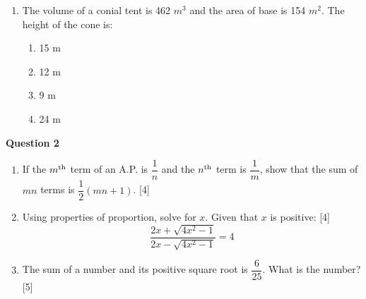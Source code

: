 \begin{enumerate}[label=(\roman*)]
    \item The volume of a conial tent is 462 $m^3$ and the area 
        of base is 154 $m^2$. The height of the cone is:

        \begin{multicols}{2}
        \begin{enumerate}[label=(\alph*)]
            \item  15 m
            \item  12 m
            \item  9 m
            \item  24 m
        \end{enumerate}
        \end{multicols}

\end{enumerate}

\newpage
\par
\noindent
\textbf{Question 2}\\
\begin{enumerate}[label=(\roman*)]

    \item If the $m\textsuperscript{th}$ term of an A.P. is 
        $\dfrac{1}{n}$ and the $n\textsuperscript{th}$ term is 
        $\dfrac{1}{m}$, show that the sum of $mn$ terms is 
        $\dfrac{1}{2}(mn + 1)$. \hfill [4]

    \item Using properties of proportion, solve for $x$. Given that 
        $x$ is positive: \hfill [4]
        \[
            \frac{2x + \sqrt{4x^2 - 1}}{2x - \sqrt{4x^2 - 1}} = 4
        \]

    \item The sum of a number and its positive square root is 
        $\dfrac{6}{25}$. What is the number? \hfill [5]

\end{enumerate}
